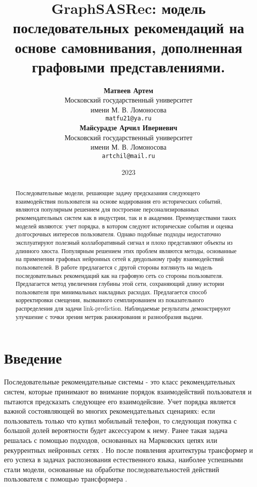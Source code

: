 \documentclass{article}
\title{GraphSASRec: модель последовательных рекомендаций на основе самовнивания, дополненная графовыми представлениями.}
\author{ 
	\textbf{Матвеев Артем} \\
    Московский государственный университет \\ 
	имени М. В. Ломоносова \\
	\texttt{matfu21@ya.ru} \\
	\And
	\textbf{Майсурадзе Арчил Ивериевич} \\
    Московский государственный университет \\
	имени М. В. Ломоносова \\
	\texttt{artchil@mail.ru} \\
}
\date{2023}
\begin{document}
\maketitle

\begin{abstract}
	Последовательные модели, решающие задачу предсказания следующего взаимодействия пользователя на 
	основе кодирования его исторических событий, являются популярным решением для построение 
	персонализированных рекомендательных систем как в индустрии, так и в академии. Преимуществами 
	таких моделей являются: учет порядка, в котором следуют исторические события и оценка долгосрочных 
	интересов пользователя. Однако подобные подходы недостаточно эксплуатируют полезный коллаборативный
	сигнал и плохо представляют объекты из длинного хвоста. Популярным решением этих проблем являются 
	методы, основанные на применении графовых нейронных сетей к двудольному графу взаимодействий 
	пользователей. В работе предлагается с другой стороны взглянуть на модель последовательных рекомендаций
	как на графовую сеть со стороны пользователя. Предлагается метод увеличения глубины этой сети,
	сохраняющий длину истории пользователя при минимальных накладных расходах. Предлагается способ корректировки
	смещения, вызванного семплированием из показательного распределения для задачи link-prediction. 
	Наблюдаемые результаты демонстрируют улучшение с точки зрения метрик ранжирования и разнообразия выдачи.
\end{abstract}



\section{Введение}

Последовательные рекомендательные системы - это класс рекомендательных систем, которые принимают 
во внимание порядок взаимодействий пользователя и пытаются предсказать следующее его взаимодейсвие.
Учет порядка является важной состоявляющей во многих рекомендательных сценариях: если пользователь
только что купил мобильный телефон, то следующая покупка с большой долей вероятности будет 
аксессуаром к нему. Ранее такая задача решалась с помощью подходов, основанных на Марковских 
цепях \cite{mc} или рекуррентных нейронных сетях \cite{rnn1,rnn2,rnn3}. Но после появления архитектуры
трансформер \cite{transformer} и его успеха в задачах распознования естественного языка, наиболее успешными
стали модели, основанные на обработке последовательностей действий пользователя с помощью трансформера 
\cite{sasrec,bert4rec,gsasrec}. 
\end{document}
